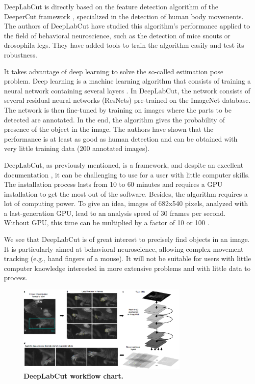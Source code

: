     DeepLabCut is directly based on the feature detection algorithm of the DeeperCut framework \cite{insafutdinov2016deepercut}, specialized in the detection of human body movements. The authors of DeepLabCut have studied this algorithm's performance applied to the field of behavioral neuroscience, such as the detection of mice snouts or drosophila legs. They have added tools to train the algorithm easily and test its robustness.

    It takes advantage of deep learning to solve the so-called estimation pose problem. Deep learning is a machine learning algorithm that consists of training a neural network containing several layers \cite{Goodfellow-et-al-2016}. In DeepLabCut, the network consists of several residual neural networks (ResNets) pre-trained on the ImageNet database. The network is then fine-tuned by training on images where the parts to be detected are annotated. In the end, the algorithm gives the probability of presence of the object in the image. The authors have shown that the performance is at least as good as human detection and can be obtained with very little training data (200 annotated images).

    DeepLabCut, as previously mentioned, is a framework, and despite an excellent documentation \cite{nath2019using}, it can be challenging to use for a user with little computer skills. The installation process lasts from 10 to 60 minutes and requires a GPU installation to get the most out of the software. Besides, the algorithm requires a lot of computing power. To give an idea, images of 682x540 pixels, analyzed with a last-generation GPU, lead to an analysis speed of 30 frames per second. Without GPU, this time can be multiplied by a factor of 10 or 100 \cite{mathis2018inference}.

    We see that DeepLabCut is of great interest to precisely find objects in an image. It is particularly aimed at behavioral neuroscience, allowing complex movement tracking (e.g., hand fingers of a mouse). It will not be suitable for users with little computer knowledge interested in more extensive problems and with little data to process.

    \begin{figure}[h]
    \centering
    \includegraphics[width=0.75\textwidth]{part_1/assets/deeplabcut.png}
    \caption{{\bf DeepLabCut workflow chart.}}
    \label{part_1:deeplabcut}
    \end{figure}

